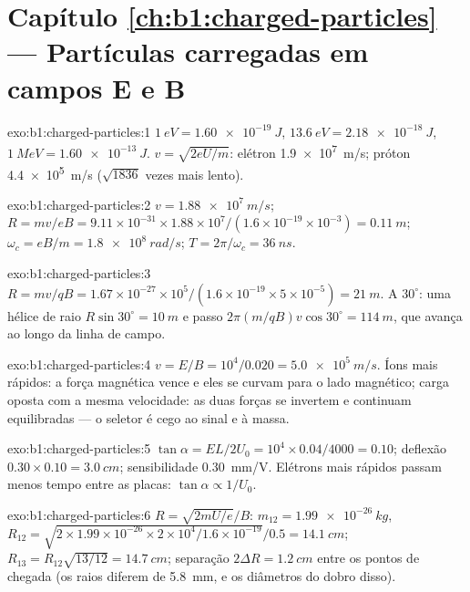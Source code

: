 \section*{Capítulo \ref{ch:b1:charged-particles} --- Partículas carregadas em campos E e B}

\begin{solution}{exo:b1:charged-particles:1}
$\qty{1}{eV} = \qty{1.60e-19}{J}$, $\qty{13.6}{eV} = \qty{2.18e-18}{J}$,
$\qty{1}{MeV} = \qty{1.60e-13}{J}$. $v = \sqrt{2eU/m}$: elétron
\qty{1.9e7}{m/s}; próton \qty{4.4e5}{m/s} ($\sqrt{1836}$ vezes mais lento).
\end{solution}

\begin{solution}{exo:b1:charged-particles:2}
$v = \qty{1.88e7}{m/s}$; $R = mv/eB = 9.11\times10^{-31} \times 1.88\times10^7/
(1.6\times10^{-19} \times 10^{-3}) = \qty{0.11}{m}$; $\omega_c = eB/m =
\qty{1.8e8}{rad/s}$; $T = 2\pi/\omega_c = \qty{36}{ns}$.
\end{solution}

\begin{solution}{exo:b1:charged-particles:3}
$R = mv/qB = 1.67\times10^{-27} \times 10^5/(1.6\times10^{-19} \times 5\times
10^{-5}) = \qty{21}{m}$. A $30^\circ$: uma hélice de raio $R\sin 30^\circ
= \qty{10}{m}$ e passo $2\pi(m/qB)v\cos 30^\circ = \qty{114}{m}$, que avança
ao longo da linha de campo.
\end{solution}

\begin{solution}{exo:b1:charged-particles:4}
$v = E/B = 10^4/0.020 = \qty{5.0e5}{m/s}$. Íons mais rápidos: a força magnética
vence e eles se curvam para o lado magnético; carga oposta com a mesma
velocidade: as duas forças se invertem e continuam equilibradas --- o seletor é cego ao
sinal e à massa.
\end{solution}

\begin{solution}{exo:b1:charged-particles:5}
$\tan\alpha = EL/2U_0 = 10^4 \times 0.04/4000 = 0.10$; deflexão
$0.30 \times 0.10 = \qty{3.0}{cm}$; sensibilidade \qty{0.30}{mm/V}. Elétrons
mais rápidos passam menos tempo entre as placas: $\tan\alpha \propto 1/U_0$.
\end{solution}

\begin{solution}{exo:b1:charged-particles:6}
$R = \sqrt{2mU/e}/B$: $m_{12} = \qty{1.99e-26}{kg}$, $R_{12} = \sqrt{2 \times
1.99\times10^{-26} \times 2\times10^4/1.6\times10^{-19}}/0.5 = \qty{14.1}{cm}$;
$R_{13} = R_{12}\sqrt{13/12} = \qty{14.7}{cm}$; separação $2\Delta R =
\qty{1.2}{cm}$ entre os pontos de chegada (os raios diferem de \qty{5.8}{mm},
e os diâmetros do dobro disso).
\end{solution}

